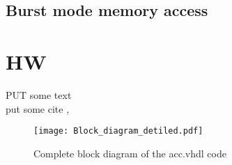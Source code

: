 \subsection*{Burst mode memory access}
\label{sec:burstmode}
\paragraph*{}


\section{HW}
\label{sec:hw}
PUT some text\\
put some cite \cite[p.11~eq.2.6]{chu2006a}, \cite[p.11~eq.2.6]{Sparsoe2014}

\begin{figure}[H]
	\centering
	\texttt{[image: Block\_diagram\_detiled.pdf]}
	\caption{Complete block diagram of the acc.vhdl code}
	\label{fig:block_acc}
\end{figure}